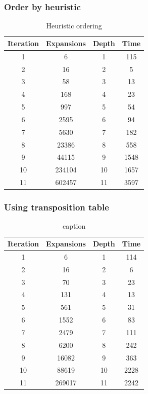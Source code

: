 \documentclass[11pt,a4paper,notitlepage]{article}
\begin{document}
\subsubsection{Order by heuristic}
\begin{table}[H]
	\begin{center}
		\begin{tabular}{c|c|c|c}
			Iteration & Expansions & Depth & Time \\
			\hline
			1 & 6 & 1 & 115 \\
			2 & 16 & 2 & 5 \\
			3 & 58 & 3 & 13 \\
			4 & 168 & 4 & 23 \\
			5 & 997 & 5 & 54 \\
			6 & 2595 & 6 & 94 \\
			7 & 5630 & 7 & 182 \\
			8 & 23386 & 8 & 558 \\
			9 & 44115 & 9 & 1548 \\
			10 & 234104 & 10 & 1657 \\
			11 & 602457 & 11 & 3597 \\
		\end{tabular}
	\end{center}
	\caption{Heuristic ordering}
	\label{table:hOrd}
\end{table}

\subsubsection{Using transposition table}
\begin{table}[H]
	\begin{center}
		\begin{tabular}{c|c|c|c}
			Iteration & Expansions & Depth & Time \\
			\hline
			1 & 6 & 1 & 114 \\
			2 & 16 & 2 & 6 \\
			3 & 70 & 3 & 23 \\
			4 & 131 & 4 & 13 \\
			5 & 561 & 5 & 31 \\
			6 & 1552 & 6 & 83 \\
			7 & 2479 & 7 & 111 \\
			8 & 6200 & 8 & 242 \\
			9 & 16082 & 9 & 363 \\
			10 & 88619 & 10 & 2228 \\
			11 & 269017 & 11 & 2242 \\
		\end{tabular}
	\end{center}
	\caption{caption}
	\label{table:label}
\end{table}
\end{document}
